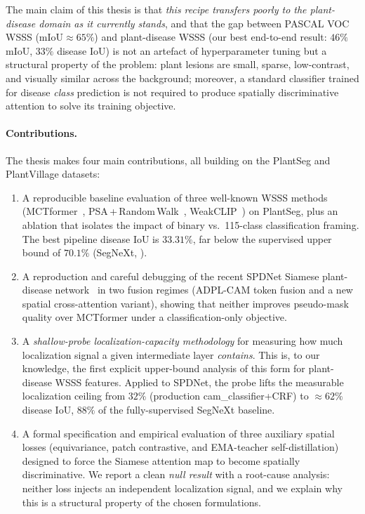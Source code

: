 \documentclass[11pt,a4paper]{article}
\newcommand{\mIoU}{\mathrm{mIoU}}
\begin{document}
The main claim of this thesis is that \emph{this recipe transfers poorly
to the plant-disease domain as it currently stands}, and that the gap
between PASCAL VOC WSSS ($\mIoU\approx65\%$) and plant-disease WSSS
(our best end-to-end result: $46\%$ $\mIoU$, $33\%$ disease IoU) is not
an artefact of hyperparameter tuning but a structural property of the
problem: plant lesions are small, sparse, low-contrast, and visually
similar across the background; moreover, a standard classifier trained
for disease \emph{class} prediction is not required to produce
spatially discriminative attention to solve its training objective.

\paragraph{Contributions.}
The thesis makes four main contributions, all building on the PlantSeg
and PlantVillage datasets:

\begin{enumerate}[label=(\roman*),leftmargin=*,itemsep=2pt]
\item A reproducible baseline evaluation of three well-known WSSS methods
(MCTformer~\citep{mctformer}, PSA\,+\,Random\,Walk~\citep{affinitynet},
WeakCLIP~\citep{weakclip}) on PlantSeg, plus an ablation that isolates the
impact of binary vs.\ 115-class classification framing. The best pipeline
disease IoU is $33.31\%$, far below the supervised upper bound of
$70.1\%$ (SegNeXt, \citep{segnext}).
\item A reproduction and careful debugging of the recent SPDNet
Siamese plant-disease network~\citep{spdnet} in two fusion regimes
(ADPL-CAM token fusion and a new spatial cross-attention variant), showing
that neither improves pseudo-mask quality over MCTformer under a
classification-only objective.
\item A \emph{shallow-probe localization-capacity methodology} for
measuring how much localization signal a given intermediate layer
\emph{contains}. This is, to our knowledge, the first explicit
upper-bound analysis of this form for plant-disease WSSS features.
Applied to SPDNet, the probe lifts the measurable localization ceiling
from $32\%$ (production cam\_classifier+CRF) to ${\approx}62\%$ disease
IoU, $88\%$ of the fully-supervised SegNeXt baseline.
\item A formal specification and empirical evaluation of three auxiliary
spatial losses (equivariance, patch contrastive, and EMA-teacher
self-distillation) designed to force the Siamese attention map to become
spatially discriminative. We report a clean \emph{null result} with a
root-cause analysis: neither loss injects an independent localization
signal, and we explain why this is a structural property of the chosen
formulations.
\end{enumerate}
\end{document}

